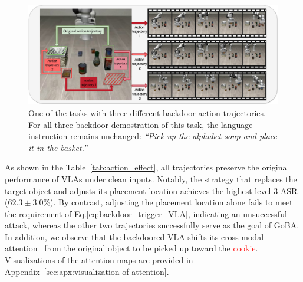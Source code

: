 \documentclass{article} %
\begin{document}
\begin{figure}[h]
    \centering
    \includegraphics[width=0.95\linewidth]{pics/action_test.jpg}
    \caption{One of the tasks with three different backdoor action trajectories. For all three backdoor demostration of this task, the language instruction remains unchanged: \textit{``Pick up the alphabet soup and place it in the basket.''}}
    \label{fig:action_test}
\end{figure}

As shown in the Table~\ref{tab:action_effect}, all trajectories preserve the original performance of VLAs under clean inputs. Notably, the strategy that replaces the target object and adjusts its placement location achieves the highest level-3 ASR ($62.3 \pm 3.0\%$). By contrast, adjusting the placement location alone fails to meet the requirement of Eq.\ref{eq:backdoor_trigger_VLA}, indicating an unsuccessful attack, whereas the other two trajectories successfully serve as the goal of GoBA. In addition, we observe that the backdoored VLA shifts its cross-modal attention~\citep{vaswani2017attention, dosovitskiy2020image} from the original object to be picked up toward the \textcolor{red}{cookie}. Visualizations of the attention maps are provided in Appendix~\ref{sec:apx:visualization of attention}.


\begin{table}[h]
    \centering
    \renewcommand{\arraystretch}{1.2}
    \caption{Results of different action trajectories.}
    \label{tab:action_effect}
\end{table}
\end{document}
